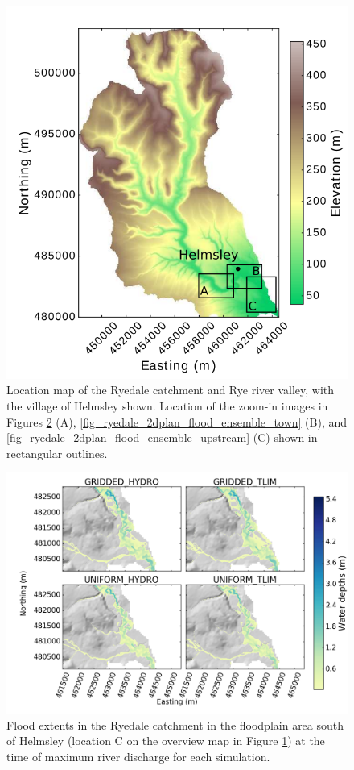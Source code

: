 \begin{figure}[!htbp]
\includegraphics[width=12cm]{chp_flood_figs_scripts/fig_ryedale_catchment_location_insets.png}
\caption{Location map of the Ryedale catchment and Rye river valley, with the village of Helmsley shown. Location of the zoom-in images in Figures \ref{fig_ryedale_2dplan_flood_ensemble_floodplain} (A), \ref{fig_ryedale_2dplan_flood_ensemble_town} (B), and \ref{fig_ryedale_2dplan_flood_ensemble_upstream} (C) shown in rectangular outlines.}
\label{fig_ryedale_2dplan_location_insets}
\end{figure}

\begin{figure}
\includegraphics[width=20cm]{chp_flood_figs_scripts/fig_ryedale_flood_ensemble_floodplain.png}
\caption{Flood extents in the Ryedale catchment in the floodplain area south of Helmsley (location C on the overview map in Figure \ref{fig_ryedale_2dplan_location_insets}) at the time of maximum river discharge for each simulation.}
\label{fig_ryedale_2dplan_flood_ensemble_floodplain}
\end{figure}

